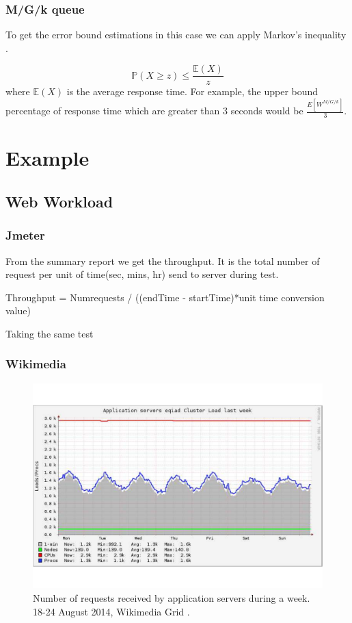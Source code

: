 \subsubsection{M/G/k queue}
To get the error bound estimations in this case we can apply Markov's inequality \cite{Markovs_inequality_wiki}.\

\begin{equation} \label{eq:markovs_inequality}
\mathbb{P} (X \geq z) \leq \frac{ \mathbb{E}(X) }{ z }
\end{equation} 
where $\mathbb{E}(X)$ is the average response time. For example, the upper bound percentage of response time which are greater than 3 seconds would be $\frac{ E[W^{M/G/k}] }{ 3 }$.



\section{Example}

\subsection{Web Workload}
\subsubsection{Jmeter}
From the summary report we get the throughput. It is the total number of request per unit of time(sec, mins, hr) send to server during test.

Throughput = Numrequests / ((endTime - startTime)*unit time conversion value)

Taking the same test

\subsubsection{Wikimedia}
\begin{figure}[!htbp]
\centering
\includegraphics[width=\textwidth,keepaspectratio]{Figures/QueueingTheory/ganglia_app_server_18to24_Aug_2014.pdf}
\caption{Number of requests received by application servers during a week. 18-24 August 2014, Wikimedia Grid \cite{Ganglia_Wikimedia_Grid_Report} .}
\label{fig:ganglia_app_server_18to24_Aug_2014}
\end{figure}

